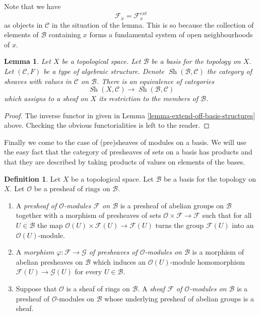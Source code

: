 \documentclass{stacks-project}
\theoremstyle{plain}
\newtheorem{lemma}[subsection]{Lemma}
\theoremstyle{definition}
\newtheorem{definition}[subsection]{Definition}
\theoremstyle{remark}
\numberwithin{equation}{subsection}
\def\Sh{\mathop{\mathit{Sh}}\nolimits}
\begin{document}
\noindent
Note that we have
$$
\mathcal{F}_x = \mathcal{F}_x^{ext}
$$
as objects in $\mathcal{C}$
in the situation of the lemma. This is so because the
collection of elements of $\mathcal{B}$ containing
$x$ forms a fundamental system of open neighbourhoods of $x$.

\begin{lemma}
\label{lemma-restrict-basis-equivalence-structures}
Let $X$ be a topological space.
Let $\mathcal{B}$ be a basis for the topology on $X$.
Let $(\mathcal{C}, F)$ be a type of algebraic structure.
Denote $\Sh(\mathcal{B}, \mathcal{C})$ the category of
sheaves with values in $\mathcal{C}$ on $\mathcal{B}$.
There is an equivalence of categories
$$
\Sh(X, \mathcal{C})
\longrightarrow
\Sh(\mathcal{B}, \mathcal{C})
$$
which assigns to a sheaf on $X$ its restriction to
the members of $\mathcal{B}$.
\end{lemma}

\begin{proof}
The inverse functor in given in
Lemma \ref{lemma-extend-off-basis-structures} above.
Checking the obvious functorialities is left to the
reader.
\end{proof}

\noindent
Finally we come to the case of (pre)sheaves of modules
on a basis. We will use the easy fact that the category
of presheaves of sets on a basis has products and that
they are described by taking products of values on
elements of the bases.

\begin{definition}
\label{definition-sheaf-modules-basis}
Let $X$ be a topological space. Let $\mathcal{B}$ be a
basis for the topology on $X$. Let $\mathcal{O}$ be
a presheaf of rings on $\mathcal{B}$.
\begin{enumerate}
\item A {\it presheaf of $\mathcal{O}$-modules $\mathcal{F}$
on $\mathcal{B}$} is a presheaf of abelian groups on
$\mathcal{B}$ together with a morphism of presheaves
of sets $\mathcal{O} \times \mathcal{F} \to \mathcal{F}$
such that for all $U \in \mathcal{B}$ the map
$\mathcal{O}(U) \times \mathcal{F}(U) \to \mathcal{F}(U)$
turns the group $\mathcal{F}(U)$ into an $\mathcal{O}(U)$-module.
\item A {\it morphism $\varphi : \mathcal{F} \to \mathcal{G}$
of presheaves of $\mathcal{O}$-modules on $\mathcal{B}$}
is a morphism of abelian presheaves on $\mathcal{B}$
which induces an $\mathcal{O}(U)$-module homomorphism
$\mathcal{F}(U) \to \mathcal{G}(U)$ for every $U \in \mathcal{B}$.
\item Suppose that $\mathcal{O}$ is a sheaf of rings
on $\mathcal{B}$. A {\it sheaf $\mathcal{F}$ of $\mathcal{O}$-modules
on $\mathcal{B}$} is a presheaf of $\mathcal{O}$-modules
on $\mathcal{B}$ whose underlying presheaf of abelian groups
is a sheaf.
\end{enumerate}
\end{definition}
\end{document}
